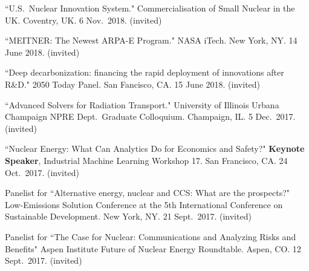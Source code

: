 \begin{bibsection}
\item ``U.S.\ Nuclear Innovation System." Commercialisation of Small Nuclear in the UK. Coventry, UK. 6 Nov.\ 2018. (invited)

\item ``MEITNER: The Newest ARPA-E Program." NASA iTech. New York, NY. 14 June 2018. (invited)

\item ``Deep decarbonization: financing the rapid deployment of innovations after R\&D." 2050 Today Panel. San Fancisco, CA. 15 June 2018. (invited)




\item ``Advanced Solvers for Radiation Transport." University of Illinois Urbana Champaign NPRE Dept.\ Graduate Colloquium. Champaign, IL. 5 Dec.\ 2017. (invited)


\item ``Nuclear Energy: What Can Analytics Do for Economics and Safety?" \textbf{Keynote Speaker}, Industrial Machine Learning Workshop 17. San Francisco, CA. 24 Oct.\ 2017. (invited)

\item Panelist for ``Alternative energy, nuclear and CCS: What are the prospects?" Low-Emissions Solution Conference at the 5th International Conference on Sustainable Development. New York, NY. 21  Sept.\ 2017. (invited)

\item Panelist for ``The Case for Nuclear: Communications and Analyzing Risks and Benefits" Aspen Institute Future of Nuclear Energy Roundtable. Aspen, CO. 12  Sept.\ 2017. (invited)


\end{bibsection}
